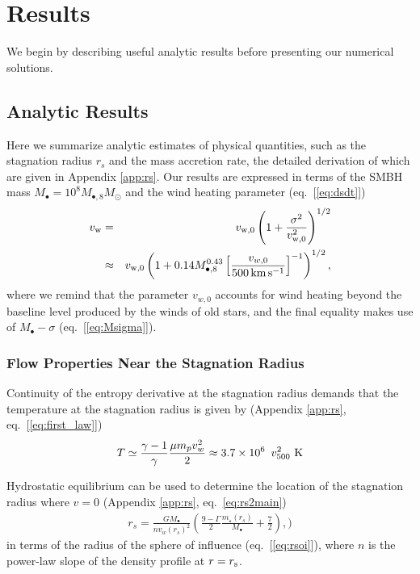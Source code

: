 \documentclass[usenatbib,fleqn]{mn2e}
\newcommand{\rs}{r_s}
\newcommand{\vw}{v_w}
\newcommand{\Mstar}{m_{\star}}
\newcommand{\Mbh}[1][]{M_{\bullet#1}}
\newcommand{\Mbheight}{M_{\bullet,8}}
\newcommand{\vwO}{v_{w,0}}
\begin{document}
\section{Results}

We begin by describing useful analytic results before presenting our numerical solutions.  

\label{sec:results}
\subsection{Analytic Results}

Here we summarize analytic estimates of physical quantities, such as the stagnation radius $\rs$ and the mass accretion rate, the detailed derivation of which are given in Appendix \ref{app:rs}.  Our results are expressed in terms of the SMBH mass $M_{\bullet} = 10^{8}M_{\bullet,8}M_{\odot}$ and the wind heating parameter (eq.~[\ref{eq:dsdt}])
\begin{eqnarray}
v_{\rm w} &=& v_{\rm w,0}\left(1+\frac{\sigma^{2}}{v_{\rm w,0}^{2}}\right)^{1/2}  \nonumber \\
 &\approx& v_{\rm w,0}\left(1+0.14 \Mbheight^{0.43}\left[\frac{v_{w,0}}{500\,\rm km\,s^{-1}}\right]^{-1}\right)^{1/2},
\end{eqnarray}
where we remind that the parameter $\vwO$ accounts for wind heating beyond the baseline level produced by the winds of old stars, and the final equality makes use of $M_{\bullet}-\sigma$ (eq.~[\ref{eq:Msigma}]).

\subsubsection{Flow Properties Near the Stagnation Radius}

Continuity of the entropy derivative at the stagnation radius demands that the temperature at the stagnation radius is given by (Appendix \ref{app:rs}, eq.~[\ref{eq:first_law}])
\begin{align}
T \simeq \frac{\gamma-1}{\gamma}\frac{\mu m_p v_{w}^{2}}{2} \approx 3.7
\times 10^6\ \, v_{500}^2 \,\,{\rm K} 
\label{eq:Tanalytic}
\end{align}

Hydrostatic equilibrium can be used to determine the location of the stagnation radius where $v = 0$ (Appendix \ref{app:rs}, eq.~\ref{eq:rs2main})
\begin{align}
\rs=\frac{G \Mbh}{n \vw(\rs)^2}\left(\frac{9-\Gamma}{2} \frac{\Mstar(\rs)}{\Mbh} +\frac{7}{2}\right),
\label{eq:stag_analytic})
\end{align}
in terms of the radius of the sphere of influence (eq.~[\ref{eq:rsoi}]), where $n$ is the power-law slope of the density profile at $r = r_{\rm s}$.
\end{document}

